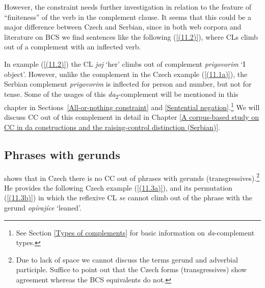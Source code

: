 \noindent However, the constraint needs further investigation in relation to the feature of “finiteness” of the verb in the complement clause. It seems that this could be a major difference between Czech and Serbian, since in both web corpora and literature on BCS we find sentences like the following (\ref{(11.2)}), where CLs climb out of a complement with an inflected verb. 


\noindent In example (\ref{(11.2)}) the CL \textit{joj} ‘her’ climbs out of complement \textit{prigovorim} ‘I object’. However, unlike the complement in the Czech example (\ref{(11.1a)}), the Serbian complement \textit{prigovorim} is inflected for person and number, but not for tense. Some of the usages of this \textit{da}\textsubscript{2}-complement will be mentioned in this chapter in Sections~\ref{All-or-nothing constraint} and \ref{Sentential negation}.\footnote{See Section \ref{Types of complements} for basic information on \textit{da}-complement types.} We will discuss CC out of this complement in detail in Chapter \ref{A corpus-based study on CC in da constructions and the raising-control distinction (Serbian)}. 

\subsection{Phrases with gerunds}
\label{Phrases with gerunds}

\citet[70f]{Junghanns02} shows that in Czech there is no CC out of phrases with gerunds (transgressives).\footnote{Due to lack of space we cannot discuss the terms gerund and adverbial participle. Suffice to point out that the Czech forms (transgressives) show agreement whereas the BCS equivalents do not.} He provides the following Czech example (\ref{(11.3a)}), and its permutation (\ref{(11.3b)}) in which the reflexive CL \textit{se} cannot climb out of the phrase with the gerund \textit{opírajíce} ‘leaned’.

